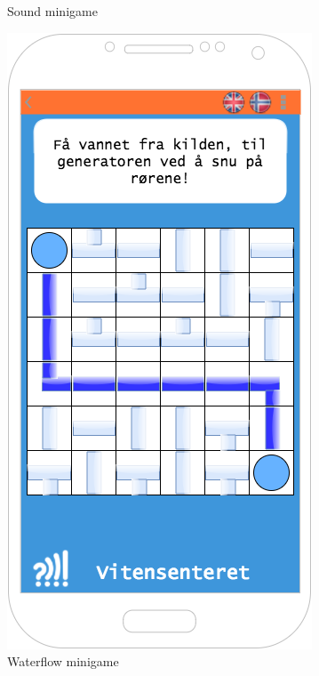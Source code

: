 \begin{figure}[H]
\begin{minipage}[b]{0.35\textwidth}
    \caption{Sound minigame}
  \end{minipage}
  \hfill
  \begin{minipage}[b]{0.35\textwidth}
    \includegraphics[width=\textwidth]{images/sketches/WaterFlow.png}
    \caption{Waterflow minigame}
  \end{minipage}
\end{figure}


